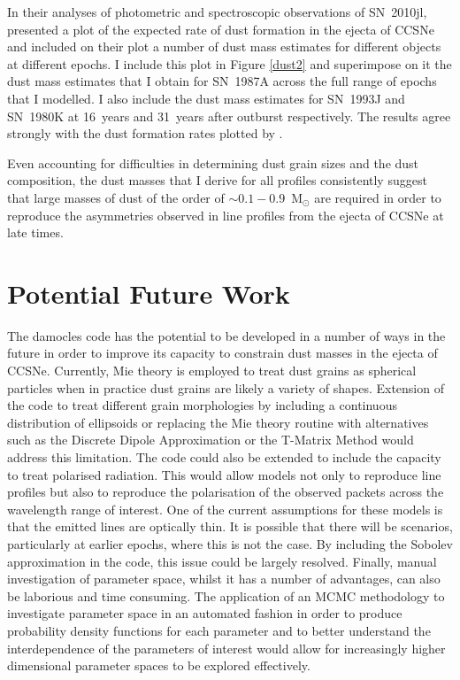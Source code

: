 In their analyses of photometric and spectroscopic observations of SN~2010jl, \citet{Gall2014} presented a plot of the expected rate of dust formation in the ejecta of CCSNe and included on their plot a number of dust mass estimates for different objects at different epochs.  I include this plot in Figure \ref{dust2} and superimpose on it the dust mass estimates that I obtain for SN~1987A across the full range of epochs that I modelled. I also include the dust mass estimates for SN~1993J and SN~1980K at 16~years and 31~years after outburst respectively.  The results agree strongly with the dust formation rates plotted  by \citet{Gall2014}.

Even accounting for difficulties in determining dust grain sizes and the dust composition, the dust masses that I derive for all profiles consistently suggest that large masses of dust of the order of $\sim0.1-0.9$~M$_{\odot}$ are required in order to reproduce the asymmetries observed in  line profiles from the ejecta of CCSNe at late times.  

\section{Potential Future Work}

The {\sc damocles} code has the potential to be developed in a number of ways in the future in order to improve its capacity to constrain dust masses in the ejecta of CCSNe.  Currently, Mie theory is employed to treat dust grains as spherical particles when in practice dust grains are likely a variety of shapes.  Extension of the code to treat different grain morphologies by including a continuous distribution of ellipsoids or replacing the Mie theory routine with alternatives such as the Discrete Dipole Approximation or the T-Matrix Method would address this limitation. The code could also be extended to include the capacity to treat polarised radiation.  This would allow models not only to reproduce line profiles but also to reproduce the polarisation of the observed packets across the wavelength range of interest.  One of the current assumptions for these models is that the emitted lines are optically thin.  It is possible that there will be scenarios, particularly at earlier epochs, where this is not the case.  By including the Sobolev approximation \citep{Sobolev1957} in the code, this issue could be largely resolved.  Finally, manual investigation of parameter space, whilst it has a number of advantages, can also be laborious and time consuming.  The application of an MCMC methodology to investigate parameter space in an automated fashion in order to produce probability density functions for each parameter and to better understand the interdependence of the parameters of interest would allow for increasingly higher dimensional parameter spaces to be explored effectively.

